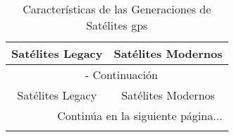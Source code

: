 \begin{center}
    \begin{longtable}{|c|c|c|c|c|}
        \caption{Características de las Generaciones de Satélites \gls{gps}} \label{tab:gps_satellites} \\
        \hline
        \multicolumn{2}{|c|}{Satélites Legacy} &
        \multicolumn{3}{|c|}{Satélites Modernos} \\
        \hline
        \endfirsthead
    
        \multicolumn{5}{c}{{\tablename\ \thetable{} - Continuación}} \\
        \hline
        \multicolumn{2}{|c|}{Satélites Legacy} &
        \multicolumn{3}{|c|}{Satélites Modernos} \\
        \hline
        \endhead
    
        \hline
        \multicolumn{5}{r}{{\fontsize{9}{11}\selectfont Continúa en la siguiente página...}} \\
        \endfoot
    
        \hline
        \endlastfoot


\end{longtable}
\end{center}
